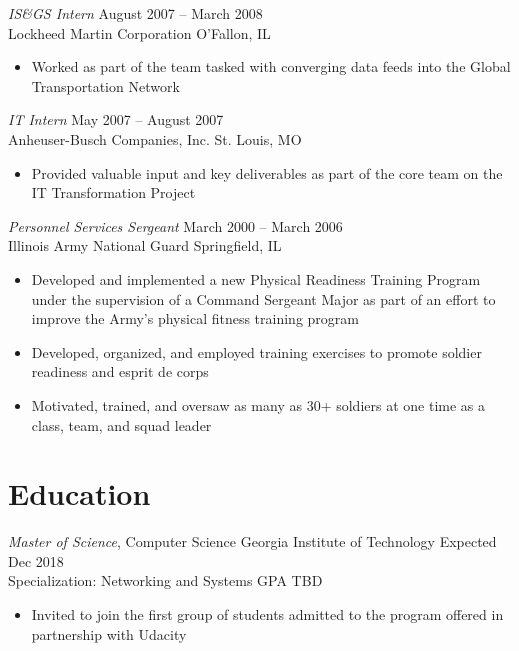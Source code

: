 \documentclass[margin,line]{resume}
\begin{document}
\begin{resume}
\begin{itemize}
\end{itemize}

{\sl IS\&GS Intern}                 \hfill  August 2007 -- March 2008\\
Lockheed Martin Corporation         \hfill  O'Fallon, IL
\begin{itemize} \itemsep -2pt %
\small\item Worked as part of the team tasked with converging data feeds into the Global Transportation Network
\end{itemize}

{\sl IT Intern}                     \hfill  May 2007 -- August 2007\\
Anheuser-Busch Companies, Inc.      \hfill  St. Louis, MO
\begin{itemize} \itemsep -2pt %
\small\item Provided valuable input and key deliverables as part of the core team on the IT Transformation Project
\end{itemize}

{\sl Personnel Services Sergeant}   \hfill   March 2000 -- March 2006\\
Illinois Army National Guard        \hfill   Springfield, IL
\begin{itemize} \itemsep -2pt %
\small\item Developed and implemented a new Physical Readiness Training Program under the supervision of a
            Command Sergeant Major as part of an effort to improve the Army's physical fitness training program
\small\item Developed, organized, and employed training exercises to promote soldier readiness and esprit de corps
\small\item Motivated, trained, and oversaw as many as 30+ soldiers at one time as a class, team, and squad leader
\end{itemize}

\section{Education}
{\small
  {\sl Master of Science}, Computer Science \hfill
  Georgia Institute of Technology\hfill
  Expected Dec 2018\\
  Specialization: Networking and Systems \hfill
  GPA TBD%
}
\begin{itemize} \itemsep -2pt %
\small\item Invited to join the first group of students admitted to the program offered in partnership with Udacity
\end{itemize}


\end{resume}
\end{document}
